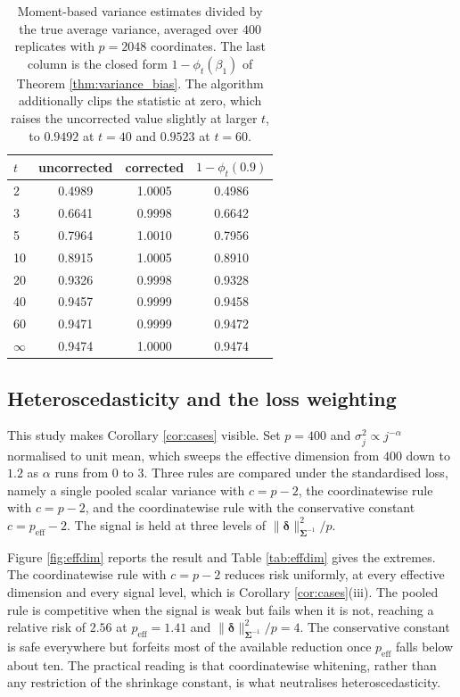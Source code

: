 \documentclass[a4paper,fleqn]{cas-dc}
\theoremstyle{plain}
\theoremstyle{definition}
\theoremstyle{remark}
\newcommand{\peff}{p_{\mathrm{eff}}}
\begin{document}
\begin{table}
\centering
\caption{Moment-based variance estimates divided by the true average variance, averaged over $400$ replicates with $p=2048$ coordinates. The last column is the closed form $1-\phi_t(\beta_1)$ of Theorem \ref{thm:variance_bias}. The algorithm additionally clips the statistic at zero, which raises the uncorrected value slightly at larger $t$, to $0.9492$ at $t=40$ and $0.9523$ at $t=60$.}
\label{tab:variance}
\begin{tabular}{lccc}
\toprule
$t$ & uncorrected & corrected & $1-\phi_t(0.9)$ \\
\midrule
2   & 0.4989 & 1.0005 & 0.4986 \\
3   & 0.6641 & 0.9998 & 0.6642 \\
5   & 0.7964 & 1.0010 & 0.7956 \\
10  & 0.8915 & 1.0005 & 0.8910 \\
20  & 0.9326 & 0.9998 & 0.9328 \\
40  & 0.9457 & 0.9999 & 0.9458 \\
60  & 0.9471 & 0.9999 & 0.9472 \\
$\infty$ & 0.9474 & 1.0000 & 0.9474 \\
\bottomrule
\end{tabular}
\end{table}

\subsection{Heteroscedasticity and the loss weighting}

This study makes Corollary \ref{cor:cases} visible. Set $p=400$ and $\sigma^2_j\propto j^{-\alpha}$ normalised to unit mean, which sweeps the effective dimension from $400$ down to $1.2$ as $\alpha$ runs from $0$ to $3$. Three rules are compared under the standardised loss, namely a single pooled scalar variance with $c=p-2$, the coordinatewise rule with $c=p-2$, and the coordinatewise rule with the conservative constant $c=\peff-2$. The signal is held at three levels of $\|\bm\delta\|^2_{\bm\Sigma^{-1}}/p$.

Figure \ref{fig:effdim} reports the result and Table \ref{tab:effdim} gives the extremes. The coordinatewise rule with $c=p-2$ reduces risk uniformly, at every effective dimension and every signal level, which is Corollary \ref{cor:cases}(iii). The pooled rule is competitive when the signal is weak but fails when it is not, reaching a relative risk of $2.56$ at $\peff=1.41$ and $\|\bm\delta\|^2_{\bm\Sigma^{-1}}/p=4$. The conservative constant is safe everywhere but forfeits most of the available reduction once $\peff$ falls below about ten. The practical reading is that coordinatewise whitening, rather than any restriction of the shrinkage constant, is what neutralises heteroscedasticity.
\end{document}
